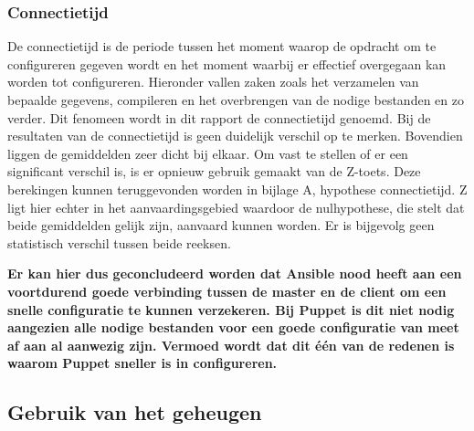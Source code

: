 \subsubsection{Connectietijd}

De \gls{connectietijd} is de periode tussen het moment waarop de opdracht om te configureren gegeven wordt en het moment waarbij er effectief overgegaan kan worden tot configureren. Hieronder vallen zaken zoals het verzamelen van bepaalde gegevens, compileren en het overbrengen van de nodige bestanden en zo verder. Dit fenomeen wordt in dit rapport de \gls{connectietijd} genoemd. Bij de resultaten van de connectietijd is geen duidelijk verschil op te merken. Bovendien liggen de gemiddelden zeer dicht bij elkaar. Om vast te stellen of er een significant verschil is, is er opnieuw gebruik gemaakt van de Z-toets. Deze berekingen kunnen teruggevonden worden in bijlage A, hypothese connectietijd. Z ligt hier echter in het aanvaardingsgebied waardoor de nulhypothese, die stelt dat beide gemiddelden gelijk zijn, aanvaard kunnen worden. Er is bijgevolg geen statistisch verschil tussen beide reeksen.

\textbf{Er kan hier dus geconcludeerd worden dat Ansible nood heeft aan een voortdurend goede verbinding tussen de master en de client om een snelle configuratie te kunnen verzekeren. Bij Puppet is dit niet nodig aangezien alle nodige bestanden voor een goede configuratie van meet af aan al aanwezig zijn. Vermoed wordt dat dit \'e\'en van de redenen is waarom Puppet sneller is in configureren.}






\subsection{Gebruik van het geheugen}

